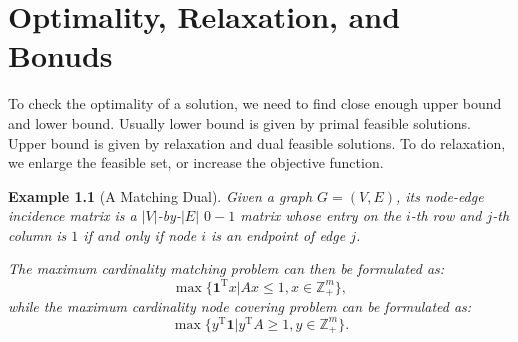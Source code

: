 \documentclass[openany]{book}
\newtheorem{example}{Example}[chapter]
\begin{document}
\chapter{Optimality, Relaxation, and Bonuds}
To check the optimality of a solution, we need to find close enough upper bound and lower bound. Usually lower bound is given by primal feasible solutions. Upper bound is given by relaxation and dual feasible solutions. To do relaxation, we enlarge the feasible set, or increase the objective function.

\begin{example}[A Matching Dual]
    Given a graph $G=(V,E)$, its node-edge incidence matrix is a $|V|$-by-$|E|$ $0-1$ matrix whose entry on the $i$-th row and $j$-th column is $1$ if and only if node $i$ is an endpoint of edge $j$.

    The maximum cardinality matching problem can then be formulated as:
    \begin{equation}
        \max\{\mathbf{1}^{\mathrm{T}}x|Ax\le1,x\in \mathbb{Z}_+^m\},
    \end{equation}
    while the maximum cardinality node covering problem can be formulated as:
    \begin{equation}
        \max\{y^{\mathrm{T}}\mathbf{1}|y^{\mathrm{T}}A\ge1,y\in \mathbb{Z}_+^m\}.
    \end{equation}
\end{example}
\end{document}
